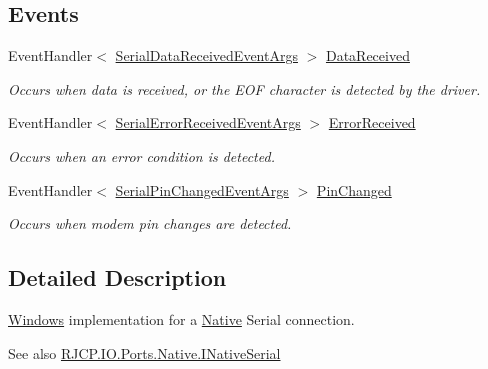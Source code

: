 \subsection*{Events}
\begin{DoxyCompactItemize}
\item 
Event\+Handler$<$ \mbox{\hyperlink{class_r_j_c_p_1_1_i_o_1_1_ports_1_1_serial_data_received_event_args}{Serial\+Data\+Received\+Event\+Args}} $>$ \mbox{\hyperlink{class_r_j_c_p_1_1_i_o_1_1_ports_1_1_native_1_1_unix_native_serial_adc08f33b7d8b09ea7e2a92cb9609b554}{Data\+Received}}
\begin{DoxyCompactList}\small\item\em Occurs when data is received, or the E\+OF character is detected by the driver. \end{DoxyCompactList}\item 
Event\+Handler$<$ \mbox{\hyperlink{class_r_j_c_p_1_1_i_o_1_1_ports_1_1_serial_error_received_event_args}{Serial\+Error\+Received\+Event\+Args}} $>$ \mbox{\hyperlink{class_r_j_c_p_1_1_i_o_1_1_ports_1_1_native_1_1_unix_native_serial_a9f76774feeee675c6b5ea66c75b8eb14}{Error\+Received}}
\begin{DoxyCompactList}\small\item\em Occurs when an error condition is detected. \end{DoxyCompactList}\item 
Event\+Handler$<$ \mbox{\hyperlink{class_r_j_c_p_1_1_i_o_1_1_ports_1_1_serial_pin_changed_event_args}{Serial\+Pin\+Changed\+Event\+Args}} $>$ \mbox{\hyperlink{class_r_j_c_p_1_1_i_o_1_1_ports_1_1_native_1_1_unix_native_serial_a076b209f454527a7f38615f20180fae1}{Pin\+Changed}}
\begin{DoxyCompactList}\small\item\em Occurs when modem pin changes are detected. \end{DoxyCompactList}\end{DoxyCompactItemize}


\subsection{Detailed Description}
\mbox{\hyperlink{namespace_r_j_c_p_1_1_i_o_1_1_ports_1_1_native_1_1_windows}{Windows}} implementation for a \mbox{\hyperlink{namespace_r_j_c_p_1_1_i_o_1_1_ports_1_1_native}{Native}} Serial connection. 

\begin{DoxySeeAlso}{See also}
\mbox{\hyperlink{interface_r_j_c_p_1_1_i_o_1_1_ports_1_1_native_1_1_i_native_serial}{R\+J\+C\+P.\+I\+O.\+Ports.\+Native.\+I\+Native\+Serial}}


\end{DoxySeeAlso}


